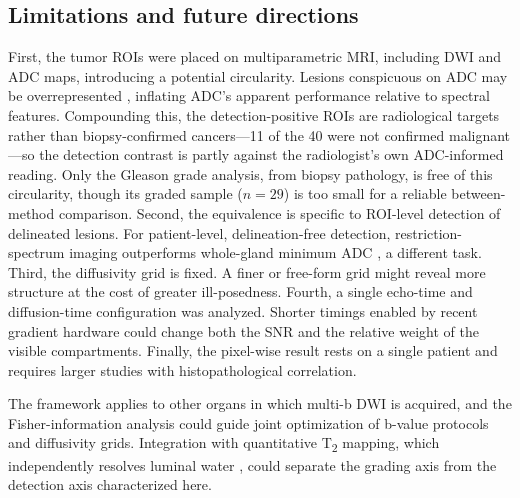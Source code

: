 \subsection{Limitations and future directions}
First, the tumor ROIs were placed on multiparametric MRI, including DWI and ADC maps, introducing a potential circularity. Lesions conspicuous on ADC may be overrepresented \citep{langkilde2018evaluation}, inflating ADC's apparent performance relative to spectral features. Compounding this, the detection-positive ROIs are radiological targets rather than biopsy-confirmed cancers---11 of the 40 were not confirmed malignant---so the detection contrast is partly against the radiologist's own ADC-informed reading. Only the Gleason grade analysis, from biopsy pathology, is free of this circularity, though its graded sample ($n = 29$) is too small for a reliable between-method comparison.
Second, the equivalence is specific to ROI-level detection of delineated lesions. For patient-level, delineation-free detection, restriction-spectrum imaging outperforms whole-gland minimum ADC \citep{domingo2025restriction}, a different task.
Third, the diffusivity grid is fixed. A finer or free-form grid might reveal more structure at the cost of greater ill-posedness.
Fourth, a single echo-time and diffusion-time configuration was analyzed. Shorter timings enabled by recent gradient hardware \citep{zhu2024human, elsaid2026nonlinear} could change both the SNR and the relative weight of the visible compartments.
Finally, the pixel-wise result rests on a single patient and requires larger studies with histopathological correlation.

The framework applies to other organs in which multi-b DWI is acquired, and the Fisher-information analysis could guide joint optimization of b-value protocols and diffusivity grids. Integration with quantitative T\textsubscript{2} mapping, which independently resolves luminal water \citep{sabouri2017luminal}, could separate the grading axis from the detection axis characterized here.
